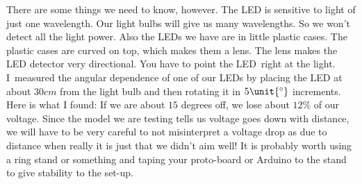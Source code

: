 There are some things we need to know, however. The LED is sensitive to
light of just one wavelength. Our light bulbs will give us many wavelengths.
So we won't detect all the light power. Also the LEDs we have are in little
plastic cases. The plastic cases are curved on top, which makes them a lens. 
The lens makes the LED detector
very directional. You have to point the LED\ right at the light. I\ measured
the angular dependence of one of our LEDs by placing the LED at about $30%
\unit{cm}$ from the light bulb and then rotating it in $5\unit{%
	{{}^\circ}%
}$ increments. Here is what I found: If we are about $15$ degrees off,
we lose about $12\%$ of our voltage. Since the model we are testing tells us
voltage goes down with distance, we will have to be very careful to not
misinterpret a voltage drop as due to distance when really it is just that
we didn't aim well! It is probably worth using a ring stand or something and
taping your proto-board or Arduino to the stand to give stability to the
set-up.

